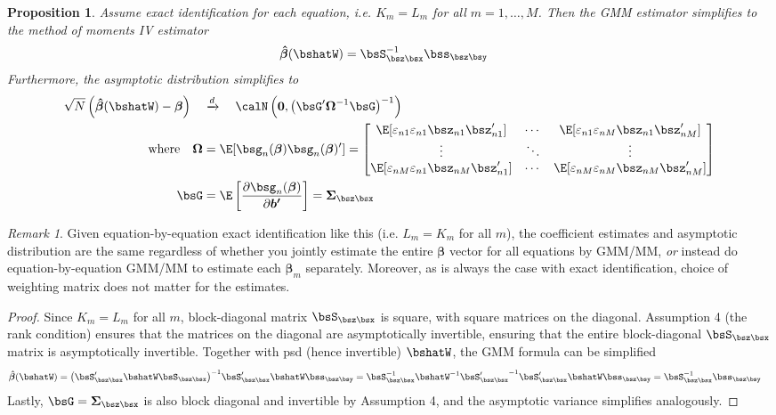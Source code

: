 \documentclass[12pt]{article}
\theoremstyle{plain}
\newtheorem{prop}[thm]{Proposition}
\theoremstyle{definition}
\theoremstyle{remark}
\newtheorem*{rmk}{Remark}
\newcommand{\bsSigma}{\boldsymbol{\Sigma}}
\newcommand{\bsbeta}{\boldsymbol{\beta}}
\newcommand{\bsOmega}{\boldsymbol{\Omega}}
\newcommand{\bshatbeta}{\boldsymbol{\hat{\beta}}}
\renewcommand{\bso}{\boldsymbol{0}}
\newcommand{\bsbp}{\boldsymbol{b'}}
\newcommand{\Var}{\operatorname{Var}}
\newcommand{\dto}{\xrightarrow{d}}
\begin{document}
\begin{prop}
Assume exact identification for each equation, i.e.
$K_m=L_m$ for all $m=1,\ldots,M$. Then the GMM estimator simplifies to
the method of moments IV estimator
\begin{align*}
  \bshatbeta(\bshatW) &=
  \bsS_{\bsz\bsx}^{-1}
  \bss_{\bsz\bsy}
\end{align*}
Furthermore, the asymptotic distribution simplifies to
\begin{align*}
  \sqrt{N}\left(\bshatbeta(\bshatW) - \bsbeta\right)
  \quad &\dto \quad
  \calN\left(\bso,
    \big(\bsG' \bsOmega^{-1} \bsG\big)^{-1}
  \right) \\
  \text{where}\quad
  \bsOmega &=
    \E[\bsg_n(\bsbeta)\bsg_n(\bsbeta)']
    =
    \begin{bmatrix}
      \E[\varepsilon_{n1}\varepsilon_{n1}\bsz_{n1}\bsz_{n1}']
      &\cdots &
      \E[\varepsilon_{n1}\varepsilon_{nM}\bsz_{n1}\bsz_{nM}']
      \\
      \vdots & \ddots & \vdots
      \\
      \E[\varepsilon_{nM}\varepsilon_{n1}\bsz_{nM}\bsz_{n1}']
      &\cdots &
      \E[\varepsilon_{nM}\varepsilon_{nM}\bsz_{nM}\bsz_{nM}']
    \end{bmatrix}
  \\
  \bsG &=
  \E\left[
    \frac{\partial \bsg_n(\bsbeta)}{\partial \bsbp}
  \right]
  =
  \bsSigma_{\bsz\bsx}
\end{align*}
\end{prop}
\begin{rmk}
Given equation-by-equation exact identification like this (i.e.
$L_m=K_m$ for all $m$), the coefficient estimates and asymptotic
distribution are the same regardless of whether you jointly estimate the
entire $\bsbeta$ vector for all equations by GMM/MM, \emph{or}
instead do equation-by-equation GMM/MM to estimate each $\bsbeta_m$
separately. Moreover, as is always the case with exact identification,
choice of weighting matrix does not matter for the estimates.
\end{rmk}
\begin{proof}
Since $K_m=L_m$ for all $m$, block-diagonal matrix
$\bsS_{\bsz\bsx}$ is square, with square matrices on the diagonal.
Assumption 4 (the rank condition) ensures that the matrices on the
diagonal are asymptotically invertible, ensuring that the entire
block-diagonal $\bsS_{\bsz\bsx}$ matrix is asymptotically invertible.
Together with psd (hence invertible) $\bshatW$, the GMM formula can be
simplified
\begin{align*}
  \bshatbeta(\bshatW) &=
  \big(\bsS_{\bsz\bsx}' \bshatW \bsS_{\bsz\bsx}\big)^{-1}
    \bsS_{\bsz\bsx}' \bshatW \bss_{\bsz\bsy}
  =
  \bsS_{\bsz\bsx}^{-1}\bshatW^{-1}
  {\bsS_{\bsz\bsx}'}^{-1}
    \bsS_{\bsz\bsx}' \bshatW \bss_{\bsz\bsy}
  =
  \bsS_{\bsz\bsx}^{-1}
  \bss_{\bsz\bsy}
\end{align*}
Lastly, $\bsG=\bsSigma_{\bsz\bsx}$ is also block diagonal and invertible
by Assumption 4, and the asymptotic variance simplifies analogously.
\end{proof}
\end{document}
